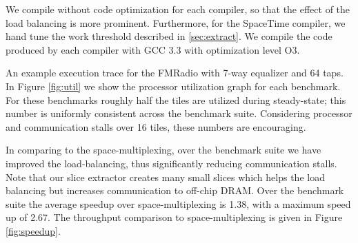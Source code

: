 We compile without code optimization for each compiler, so that the
effect of the load balancing is more prominent.  Furthermore, for the
SpaceTime compiler, we hand tune the work threshold described in
\ref{sec:extract}.  We compile the code produced by each compiler
with GCC 3.3 with optimization level O3.

An example execution trace for the FMRadio with 7-way equalizer and
64 taps.  In Figure \ref{fig:util} we show the processor utilization
graph for each benchmark. For these benchmarks roughly half the tiles
are utilized during steady-state; this number is uniformly consistent
across the benchmark suite.  Considering processor and communication
stalls over 16 tiles, these numbers are encouraging.

In comparing to the space-multiplexing, over the benchmark suite we
have improved the load-balancing, thus significantly reducing
communication stalls.  Note that our slice extractor creates many
small slices which helps the load balancing but increases
communication to off-chip DRAM.  Over the benchmark suite the average
speedup over space-multiplexing is 1.38, with a maximum speed up of
2.67. The throughput comparison to space-multiplexing is given in
Figure \ref{fig:speedup}.
